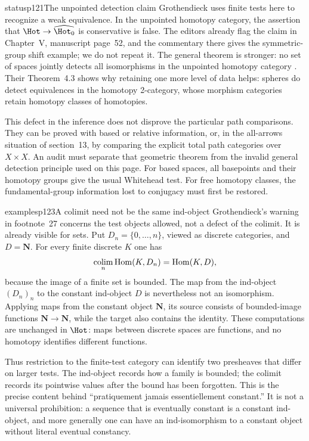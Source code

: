 \begin{dcomment}{status}{p121}{The unpointed detection claim}
Grothendieck uses finite tests here to recognize a weak equivalence. In the unpointed homotopy category, the assertion that $\Hot\to\widehat{\Hot_0}$ is conservative is false. The editors already flag the claim in Chapter~V, manuscript page~52, and the commentary there gives the symmetric-group shift example; we do not repeat it. The general theorem is stronger: no set of spaces jointly detects all isomorphisms in the unpointed homotopy category \citep[Theorem~2.1]{ArlinChristensen2023}. Their Theorem~4.3 shows why retaining one more level of data helps: spheres do detect equivalences in the homotopy 2-category, whose morphism categories retain homotopy classes of homotopies.

This defect in the inference does not disprove the particular path comparisons. They can be proved with based or relative information, or, in the all-arrows situation of section~13, by comparing the explicit total path categories over $X\times X$. An audit must separate that geometric theorem from the invalid general detection principle used on this page. For based spaces, all basepoints and their homotopy groups give the usual Whitehead test. For free homotopy classes, the fundamental-group information lost to conjugacy must first be restored.
\end{dcomment}

\begin{dcomment}{examples}{p123}{A colimit need not be the same ind-object}
Grothendieck's warning in footnote~27 concerns the test objects allowed, not a defect of the colimit. It is already visible for sets. Put $D_n=\{0,\ldots,n\}$, viewed as discrete categories, and $D=\mathbf N$. For every finite discrete $K$ one has
\[
 \mathop{\rm colim}_n\mathrm{Hom}(K,D_n)=\mathrm{Hom}(K,D),
\]
because the image of a finite set is bounded. The map from the ind-object $(D_n)_n$ to the constant ind-object $D$ is nevertheless not an isomorphism. Applying maps from the constant object $\mathbf N$, its source consists of bounded-image functions $\mathbf N\to\mathbf N$, while the target also contains the identity. These computations are unchanged in $\Hot$: maps between discrete spaces are functions, and no homotopy identifies different functions.

Thus restriction to the finite-test category can identify two presheaves that differ on larger tests. The ind-object records how a family is bounded; the colimit records its pointwise values after the bound has been forgotten. This is the precise content behind ``pratiquement jamais essentiellement constant.'' It is not a universal prohibition: a sequence that is eventually constant is a constant ind-object, and more generally one can have an ind-isomorphism to a constant object without literal eventual constancy.
\end{dcomment}

